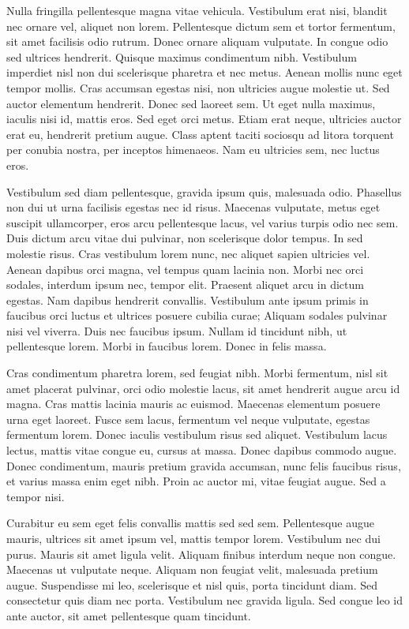\documentclass[twoside]{article}
\begin{document}
Nulla fringilla pellentesque magna vitae vehicula. Vestibulum erat nisi, blandit nec ornare vel, aliquet non lorem. Pellentesque dictum sem et tortor fermentum, sit amet facilisis odio rutrum. Donec ornare aliquam vulputate. In congue odio sed ultrices hendrerit. Quisque maximus condimentum nibh. Vestibulum imperdiet nisl non dui scelerisque pharetra et nec metus. Aenean mollis nunc eget tempor mollis. Cras accumsan egestas nisi, non ultricies augue molestie ut. Sed auctor elementum hendrerit. Donec sed laoreet sem. Ut eget nulla maximus, iaculis nisi id, mattis eros. Sed eget orci metus. Etiam erat neque, ultricies auctor erat eu, hendrerit pretium augue. Class aptent taciti sociosqu ad litora torquent per conubia nostra, per inceptos himenaeos. Nam eu ultricies sem, nec luctus eros.

Vestibulum sed diam pellentesque, gravida ipsum quis, malesuada odio. Phasellus non dui ut urna facilisis egestas nec id risus. Maecenas vulputate, metus eget suscipit ullamcorper, eros arcu pellentesque lacus, vel varius turpis odio nec sem. Duis dictum arcu vitae dui pulvinar, non scelerisque dolor tempus. In sed molestie risus. Cras vestibulum lorem nunc, nec aliquet sapien ultricies vel. Aenean dapibus orci magna, vel tempus quam lacinia non. Morbi nec orci sodales, interdum ipsum nec, tempor elit. Praesent aliquet arcu in dictum egestas. Nam dapibus hendrerit convallis. Vestibulum ante ipsum primis in faucibus orci luctus et ultrices posuere cubilia curae; Aliquam sodales pulvinar nisi vel viverra. Duis nec faucibus ipsum. Nullam id tincidunt nibh, ut pellentesque lorem. Morbi in faucibus lorem. Donec in felis massa.

Cras condimentum pharetra lorem, sed feugiat nibh. Morbi fermentum, nisl sit amet placerat pulvinar, orci odio molestie lacus, sit amet hendrerit augue arcu id magna. Cras mattis lacinia mauris ac euismod. Maecenas elementum posuere urna eget laoreet. Fusce sem lacus, fermentum vel neque vulputate, egestas fermentum lorem. Donec iaculis vestibulum risus sed aliquet. Vestibulum lacus lectus, mattis vitae congue eu, cursus at massa. Donec dapibus commodo augue. Donec condimentum, mauris pretium gravida accumsan, nunc felis faucibus risus, et varius massa enim eget nibh. Proin ac auctor mi, vitae feugiat augue. Sed a tempor nisi.

Curabitur eu sem eget felis convallis mattis sed sed sem. Pellentesque augue mauris, ultrices sit amet ipsum vel, mattis tempor lorem. Vestibulum nec dui purus. Mauris sit amet ligula velit. Aliquam finibus interdum neque non congue. Maecenas ut vulputate neque. Aliquam non feugiat velit, malesuada pretium augue. Suspendisse mi leo, scelerisque et nisl quis, porta tincidunt diam. Sed consectetur quis diam nec porta. Vestibulum nec gravida ligula. Sed congue leo id ante auctor, sit amet pellentesque quam tincidunt. 
\end{document}
